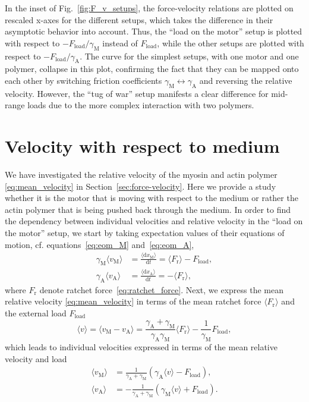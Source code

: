 \documentclass[aps,pre,twocolumn,showpacs,showkeys,superscriptaddress,floatfix]{revtex4-1}
\newcommand{\rmd}{{\mathrm d}}
\begin{document}
In the inset of Fig.~\ref{fig:F_v_setups}, 
the force-velocity relations are plotted on rescaled x-axes for the different setups, 
which takes the difference in their asymptotic behavior into account. 
Thus, the ``load on the motor'' setup is plotted with respect to $ - F_\text{load} / \gamma_\text{M}$ instead of $F_\text{load}$,
while the other setups are plotted with respect to $ - F_\text{load} / \gamma_\text{A}$.
The curve for the simplest setups, with one motor and one polymer, collapse in this plot, 
confirming the fact that they can be mapped onto each other by switching friction coefficients $\gamma_\text{M} \leftrightarrow \gamma_\text{A}$ 
and reversing the relative velocity. 
However, the ``tug of war'' setup manifests a clear difference for mid-range loads due to the more complex interaction with two polymers. 


\section{Velocity with respect to medium}
\label{sec:ind_velo}
We have investigated the relative velocity of the myosin and actin polymer \eqref{eq:mean_velocity} in Section~\ref{sec:force-velocity}. 
Here we provide a study whether it is the motor that is moving with respect to the medium or rather the actin polymer that is being pushed back through the medium.
In order to find the dependency between individual velocities and relative velocity in the ``load on the motor'' setup, 
we start by taking expectation values of their equations of motion, cf. equations~\eqref{eq:eom_M} and~\eqref{eq:eom_A},
\begin{align}
\gamma_\text{M} \langle v_\text{M} \rangle &= \frac{ \langle \rmd x_\text{M} \rangle }{\rmd t} = \langle F_\text{r} \rangle - F_\text{load} , 
\label{eq:pre_velocity_M} 
\\
\gamma_\text{A} \langle v_\text{A} \rangle &= \frac{ \langle \rmd x_\text{A} \rangle }{\rmd t} = -\langle F_\text{r} \rangle , 
\label{eq:pre_velocity_A}
\end{align}
where $F_\text{r}$ denote ratchet force~\eqref{eq:ratchet_force}. 
Next, we express the mean relative velocity \eqref{eq:mean_velocity} in terms of the mean ratchet force $\langle F_\text{r} \rangle$ and the external load $F_\text{load}$  
\begin{equation}
\langle v \rangle 
= \langle v_\text{M} - v_\text{A} \rangle 
= \frac{\gamma_\text{A} + \gamma_\text{M}}{\gamma_\text{A} \gamma_\text{M}} \langle F_\text{r} \rangle - \frac{1}{\gamma_\text{M}} F_\text{load} ,
\label{eq:mean_velocity_Fr_Fl}
\end{equation}
which leads to individual velocities expressed in terms of the mean relative velocity and load 
\begin{align}
\langle v_\text{M} \rangle &= \frac{1}{ \gamma_\text{A} + \gamma_\text{M} } \left( \gamma_\text{A} \langle v \rangle - F_\text{load} \right) ,
\label{eq:velocity_M} \\
\langle v_\text{A} \rangle &= -\frac{1}{ \gamma_\text{A} + \gamma_\text{M} } \left( \gamma_\text{M} \langle v \rangle + F_\text{load} \right) .
\label{eq:velocity_A}
\end{align}
\end{document}
